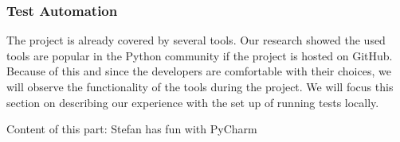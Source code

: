 \subsubsection{Test Automation}
The project is already covered by several tools.
Our research showed the used tools are popular in the Python community if the project is hosted on GitHub.
Because of this and since the developers are comfortable with their choices, we will observe the functionality of the tools during the project.
We will focus this section on describing our experience with the set up of running tests locally.

Content of this part: Stefan has fun with PyCharm
